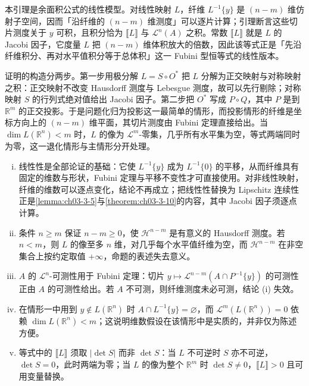 \documentclass[../../main.tex]{subfiles}%
\begin{document}
\begin{remark}\label{remark:ch03-lem-3-4-动机}
本引理是余面积公式的线性模型。对线性映射 $L$，纤维 $L^{-1}\{y\}$ 是 $(n-m)$ 维仿射子空间，因而「沿纤维的 $(n-m)$ 维测度」可以逐片计算；引理断言这些切片测度关于 $y$ 可积，且积分恰为 $\llbracket L\rrbracket$ 与 $\mathcal{L}^n(A)$ 之积。常数 $\llbracket L\rrbracket$ 就是 $L$ 的 Jacobi 因子，它度量 $L$ 把 $(n-m)$ 维体积放大的倍数，因此该等式正是「先沿纤维积分、再对水平值积分等于总体积」这一 Fubini 型恒等式的线性版本。

证明的构造分两步。第一步用极分解 $L=S\circ O^*$ 把 $L$ 分解为正交映射与对称映射之积：正交映射不改变 Hausdorff 测度与 Lebesgue 测度，故可以先行剔除；对称映射 $S$ 的行列式绝对值给出 Jacobi 因子。第二步把 $O^*$ 写成 $P\circ Q$，其中 $P$ 是到 $\mathbb{R}^m$ 的正交投影。于是问题化归为投影这一最简单的情形，而投影情形的纤维是坐标方向上的 $(n-m)$ 维平面，其切片测度由 Fubini 定理直接给出。当 $\dim L(\mathbb{R}^n)<m$ 时，$L$ 的像为 $\mathcal{L}^m$-零集，几乎所有水平集为空，等式两端同时为零，这一退化情形与主情形分开处理。
\end{remark}

\begin{remark}\label{remark:ch03-lem-3-4-条件}
\begin{enumerate}[(i)]
\item 线性性是全部论证的基础：它使 $L^{-1}\{y\}$ 成为 $L^{-1}\{0\}$ 的平移，从而纤维具有固定的维数与形状，Fubini 定理与平移不变性才可直接使用。对非线性映射，纤维的维数可以逐点变化，结论不再成立；把线性性替换为 Lipschitz 连续性正是\cref{lemma:ch03-3-5}与\cref{theorem:ch03-3-10}的内容，其中 Jacobi 因子须逐点计算。%
\item 条件 $n\geqslant m$ 保证 $n-m\geqslant0$，使 $\mathcal{H}^{n-m}$ 是有意义的 Hausdorff 测度。若 $n<m$，则 $L$ 的像至多 $n$ 维，对几乎每个水平值纤维为空，而 $\mathcal{H}^{n-m}$ 在非空集合上按约定取值 $+\infty$，命题的表述失去意义。
\item $A$ 的 $\mathcal{L}^n$-可测性用于 Fubini 定理：切片 $y\mapsto\mathcal{L}^{n-m}(A\cap P^{-1}\{y\})$ 的可测性正由 $A$ 的可测性给出。若 $A$ 不可测，则纤维测度未必可测，结论 (i) 失效。
\item 在情形一中用到 $y\notin L(\mathbb{R}^n)$ 时 $A\cap L^{-1}\{y\}=\varnothing$，而 $\mathcal{L}^m(L(\mathbb{R}^n))=0$ 依赖 $\dim L(\mathbb{R}^n)<m$；这说明维数假设在该情形中是实质的，并非仅为陈述方便。
\item 等式中的 $\llbracket L\rrbracket$ 须取 $|\det S|$ 而非 $\det S$：当 $L$ 不可逆时 $S$ 亦不可逆，$\det S=0$，此时两端为零；当 $L$ 的像为整个 $\mathbb{R}^m$ 时 $\det S\neq0$，$\llbracket L\rrbracket>0$ 且可用变量替换。
\end{enumerate}
\end{remark}
\end{document}
